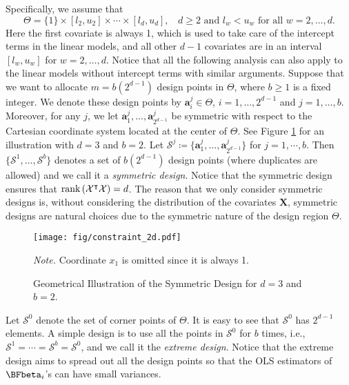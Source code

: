 \documentclass[ijoc,nonblindrev]{informs3}
\def\bX{{\bm X}}
\def\cX{{\mathcal X}}
\def\cS{{\mathcal{S}}}
\def\ba{{\bm a}}
\begin{document}
Specifically, we assume that
\begin{equation}\label{eq-Theta}
\Theta = \{1\}\times[l_2,u_2]\times\cdots\times[l_d,u_d], \ \text{ $d\geq 2$ and $l_w < u_w$ for all $w=2,\ldots,d$}.
\end{equation}
Here the first covariate is always 1, which is used to take care of the intercept terms in the linear models, and all other $d-1$ covariates are in an interval $[l_w,u_w]$ for $w=2,\ldots,d$.
Notice that all the following analysis can also apply to the linear models without intercept terms with similar arguments.
Suppose that we want to allocate $m = b(2^{d-1})$ design points in $\Theta$, where $b\geq 1$ is a fixed integer.
We denote these design points by $\ba_i^j \in \Theta$, $i=1,\ldots,2^{d-1}$ and $j=1,\ldots,b$.
Moreover, for any $j$, we let $\ba_1^j, \ldots, \ba_{2^{d-1}}^j$ be symmetric with respect to the Cartesian coordinate system located at the center of $\Theta$.
See Figure \ref{fig-constraint} for an illustration with $d=3$ and $b=2$.
Let $\cS^j \coloneqq \{\ba_1^j, \ldots, \ba_{2^{d-1}}^j\}$ for $j=1,\cdots,b$.
Then $\{\cS^1, \ldots, \cS^b\}$ denotes a set of $b(2^{d-1})$ design points (where duplicates are allowed) and we call it a \textit{symmetric design}.
Notice that the symmetric design ensures that $\textnormal{rank}\left(\cX^\intercal\cX\right) = d$.
The reason that we only consider symmetric designs is, without considering the distribution of the covariates $\bX$, symmetric designs are natural choices due to the symmetric nature of the design region $\Theta$.


\begin{figure}[]
\centering
\texttt{[image: fig/constraint\_2d.pdf]}
\caption{Geometrical Illustration of the Symmetric Design for $d=3$ and $b=2$. }\label{fig-constraint}
\begin{minipage}[t]{1\linewidth}
\vspace{-1.2em}
\SingleSpacedXI
\footnotesize{
\emph{Note.} \textsf{Coordinate $x_1$ is omitted since it is always 1.}
}
\end{minipage}
\end{figure}

Let $\cS^0$ denote the set of corner points of $\Theta$.
It is easy to see that $\cS^0$ has $2^{d-1}$ elements.
A simple design is to use all the points in $\cS^0$ for $b$ times, i.e., $\cS^1=\cdots= \cS^b = \cS^0$, and we call it the \textit{extreme design}.
Notice that the extreme design aims to spread out all the design points so that the OLS estimators of $\BFbeta_i$'s can have small variances.
\end{document}
